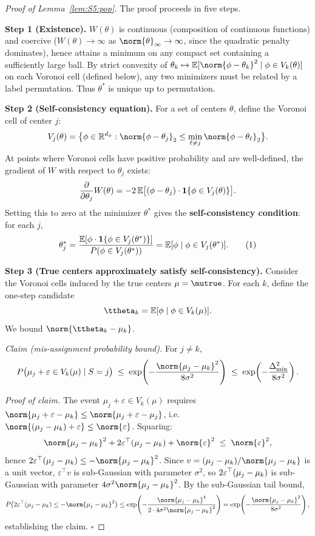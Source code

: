 \begin{proof}[Proof of Lemma~\ref{lem:S5:pop}]
The proof proceeds in five steps.

\noindent\textbf{Step 1 (Existence).}
$W(\theta)$ is continuous (composition of continuous functions) and
coercive ($W(\theta)\to\infty$ as $\norm{\theta}_\infty\to\infty$,
since the quadratic penalty dominates), hence attains a minimum on any
compact set containing a sufficiently large ball.  By strict convexity
of $\theta_k\mapsto\E[\norm{\phi-\theta_k}^2\mid\phi\in V_k(\theta)]$
on each Voronoi cell (defined below), any two minimizers must be related
by a label permutation.  Thus $\theta^*$ is unique up to permutation.

\noindent\textbf{Step 2 (Self-consistency equation).}
For a set of centers $\theta$, define the Voronoi cell of center $j$:
\[
V_j(\theta)=\bigl\{\phi\in\R^{d_\phi}:
\norm{\phi-\theta_j}_2\le\min_{\ell\neq j}\norm{\phi-\theta_\ell}_2\bigr\}.
\]
At points where Voronoi cells have positive probability and are
well-defined, the gradient of $W$ with respect to $\theta_j$ exists:
\[
\frac{\partial}{\partial\theta_j}W(\theta)
= -2\,\mathbb{E}\bigl[(\phi-\theta_j)\cdot\mathbf{1}\{\phi\in V_j(\theta)\}\bigr].
\]
Setting this to zero at the minimizer $\theta^*$ gives the
\textbf{self-consistency condition}: for each $j$,
\[
\theta^*_j = \frac{\mathbb{E}[\phi\cdot\mathbf{1}\{\phi\in V_j(\theta^*)\}]}
                 {P(\phi\in V_j(\theta^*))}
           = \mathbb{E}[\phi\mid\phi\in V_j(\theta^*)]. \tag{1}
\]

\noindent\textbf{Step 3 (True centers approximately satisfy self-consistency).}
Consider the Voronoi cells induced by the true centers $\mu=\mutrue$.
For each $k$, define the one-step candidate
\[
\ttheta_k = \E[\phi\mid\phi\in V_k(\mu)].
\]
We bound $\norm{\ttheta_k-\muk}$.

\noindent\textit{Claim (mis-assignment probability bound).}
For $j\neq k$,
\[
P\bigl(\mu_j+\varepsilon\in V_k(\mu)\mid S=j\bigr)
\;\le\; \exp\!\left(-\frac{\norm{\mu_j-\muk}^2}{8\sigma^2}\right)
\;\le\; \exp\!\left(-\frac{\Delta_{\min}^2}{8\sigma^2}\right).
\]

\noindent\textit{Proof of claim.}
The event $\mu_j+\varepsilon\in V_k(\mu)$ requires
$\norm{\mu_j+\varepsilon-\muk}\le\norm{\mu_j+\varepsilon-\mu_j}$, i.e.\
$\norm{(\mu_j-\muk)+\varepsilon}\le\norm{\varepsilon}$.  Squaring:
\[
\norm{\mu_j-\muk}^2 + 2\varepsilon^\top(\mu_j-\muk) + \norm{\varepsilon}^2
\;\le\; \norm{\varepsilon}^2,
\]
hence $2\varepsilon^\top(\mu_j-\muk) \le -\norm{\mu_j-\muk}^2$.
Since $v=(\mu_j-\muk)/\norm{\mu_j-\muk}$ is a unit vector,
$\varepsilon^\top v$ is sub-Gaussian with parameter $\sigma^2$, so
$2\varepsilon^\top(\mu_j-\mu_k)$ is sub-Gaussian with parameter
$4\sigma^2\norm{\mu_j-\muk}^2$.  By the sub-Gaussian tail bound,
\[
P\bigl(2\varepsilon^\top(\mu_j-\muk)\le -\norm{\mu_j-\muk}^2\bigr)
\le \exp\!\left(-\frac{\norm{\mu_j-\muk}^4}{2\cdot4\sigma^2\norm{\mu_j-\muk}^2}\right)
= \exp\!\left(-\frac{\norm{\mu_j-\muk}^2}{8\sigma^2}\right),
\]
establishing the claim.  $\square$


\end{proof}
